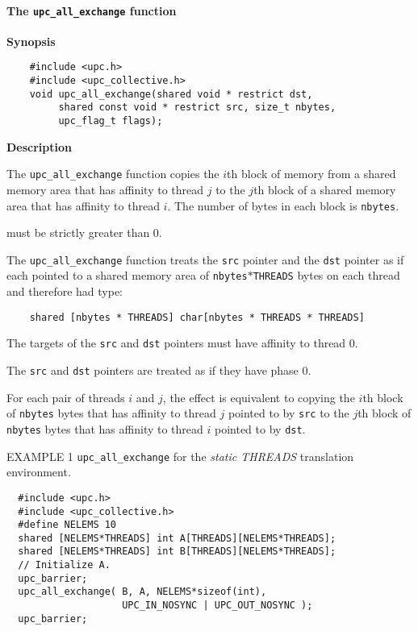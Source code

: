 \paragraph{The {\tt upc\_all\_exchange} function}

{\bf Synopsis} 

\npf\vspace{-2.5em}
\begin{verbatim}
    #include <upc.h>
    #include <upc_collective.h>
    void upc_all_exchange(shared void * restrict dst, 
         shared const void * restrict src, size_t nbytes,
         upc_flag_t flags);
\end{verbatim}

{\bf Description} 

\np The {\tt upc\_all\_exchange} function copies the $i$th block of memory
from a shared memory area that has affinity to thread $j$ to the $j$th block
of a shared memory area that has affinity to thread $i$.
The number of bytes in each block is {\tt nbytes}.

 must be strictly greater than 0.

\np The {\tt upc\_all\_exchange} function treats the {\tt src} pointer
and the {\tt dst} pointer as if each
pointed to a shared memory area of {\tt nbytes}$*${\tt THREADS} bytes
on each thread and therefore had type:

\begin{verbatim}
    shared [nbytes * THREADS] char[nbytes * THREADS * THREADS]
\end{verbatim}  

\np The targets of the {\tt src} and {\tt dst} pointers
must have affinity to thread 0.

\np The {\tt src} and {\tt dst} pointers are treated as
if they have phase 0.

\np For each pair of threads $i$ and $j$, the effect is equivalent to copying
the $i$th block of {\tt nbytes} bytes that has affinity to thread $j$
pointed to by {\tt src}
to
the $j$th block of {\tt nbytes} bytes that has affinity to thread $i$ 
pointed to by {\tt dst}.

\np EXAMPLE 1 {\tt upc\_all\_exchange} for the {\em static THREADS}
translation environment.

\begin{verbatim}
  #include <upc.h>
  #include <upc_collective.h>
  #define NELEMS 10
  shared [NELEMS*THREADS] int A[THREADS][NELEMS*THREADS];
  shared [NELEMS*THREADS] int B[THREADS][NELEMS*THREADS];
  // Initialize A.
  upc_barrier;
  upc_all_exchange( B, A, NELEMS*sizeof(int),
                    UPC_IN_NOSYNC | UPC_OUT_NOSYNC );
  upc_barrier;
\end{verbatim}

